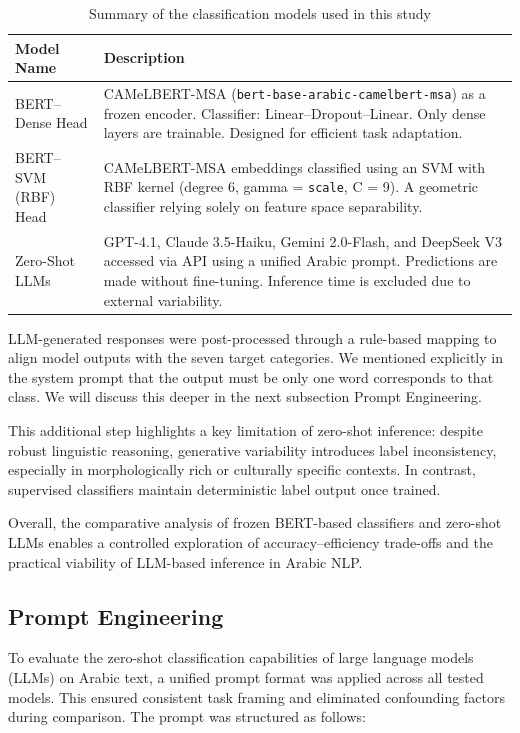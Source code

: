 \documentclass[preprint,12pt,authoryear]{elsarticle}
\begin{document}
\begin{table}[!ht]
\centering
\caption{Summary of the classification models used in this study}
\label{tab:models_summary}
\small
\begin{tabular}{@{}>{\raggedright\arraybackslash}p{3.5cm} >{\raggedright\arraybackslash}p{8cm}@{}}
\hline
\textbf{Model Name} & \textbf{Description} \\
\hline
BERT–Dense Head & CAMeLBERT-MSA (\texttt{bert-base-arabic-camelbert-msa}) as a frozen encoder. Classifier: Linear–Dropout–Linear. Only dense layers are trainable. Designed for efficient task adaptation. \\
BERT–SVM (RBF) Head & CAMeLBERT-MSA embeddings classified using an SVM with RBF kernel (degree 6, gamma = \texttt{scale}, C = 9). A geometric classifier relying solely on feature space separability. \\
Zero-Shot LLMs & GPT-4.1, Claude 3.5-Haiku, Gemini 2.0-Flash, and DeepSeek V3 accessed via API using a unified Arabic prompt. Predictions are made without fine-tuning. Inference time is excluded due to external variability. \\
\hline
\end{tabular}
\end{table}

\noindent
LLM-generated responses were post-processed through a rule-based mapping to align model outputs with the seven target categories. We mentioned explicitly in the system prompt that the output must be only one word corresponds to that class. We will discuss this deeper in the next subsection Prompt Engineering. 

This additional step highlights a key limitation of zero-shot inference: despite robust linguistic reasoning, generative variability introduces label inconsistency, especially in morphologically rich or culturally specific contexts. In contrast, supervised classifiers maintain deterministic label output once trained.

Overall, the comparative analysis of frozen BERT-based classifiers and zero-shot LLMs enables a controlled exploration of accuracy–efficiency trade-offs and the practical viability of LLM-based inference in Arabic NLP.

\subsection{Prompt Engineering}

To evaluate the zero-shot classification capabilities of large language models (LLMs) on Arabic text, a unified prompt format was applied across all tested models. This ensured consistent task framing and eliminated confounding factors during comparison. The prompt was structured as follows:
\end{document}
